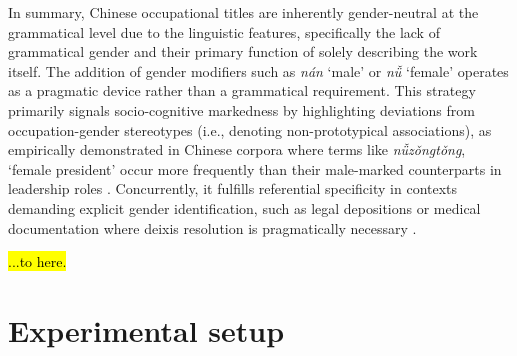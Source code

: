 \documentclass[11pt]{article}
\newcommand{\zh}[1]{\simplifiedchinesefont{#1}\rmfamily}
\begin{document}
In summary, Chinese occupational titles are inherently gender-neutral at the grammatical level due to the linguistic features, specifically the lack of grammatical gender and their primary function of solely describing the work itself. The addition of gender modifiers such as \zh{男} \textit{nán} `male' or \zh{女} \textit{nǚ} `female' operates as a pragmatic device rather than a grammatical requirement. This strategy primarily signals socio-cognitive markedness by highlighting deviations from occupation-gender stereotypes (i.e., denoting non-prototypical associations), as empirically demonstrated in Chinese corpora where terms like \zh{女总统} \textit{nǚzǒngtǒng}, `female president' occur more frequently than their male-marked counterparts in leadership roles \citep{su_2021_occupational,farris_1988_gender}. Concurrently, it fulfills referential specificity in contexts demanding explicit gender identification, such as legal depositions or medical documentation where deixis resolution is pragmatically necessary \citep{hellinger_2003_gender,stahlberg_2011_representation}.

\hl{...to here.}






\section{Experimental setup}\label{sec:experiment_setup}
\end{document}
